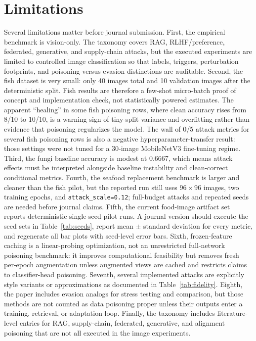 ﻿\documentclass[6p,10pt,times]{ieeeaccess}
\begin{document}
\section{Limitations}

Several limitations matter before journal submission. First, the empirical benchmark is vision-only. The taxonomy covers RAG, RLHF/preference, federated, generative, and supply-chain attacks, but the executed experiments are limited to controlled image classification so that labels, triggers, perturbation footprints, and poisoning-versus-evasion distinctions are auditable. Second, the fish dataset is very small: only 40 images total and 10 validation images after the deterministic split. Fish results are therefore a few-shot micro-batch proof of concept and implementation check, not statistically powered estimates. The apparent ``healing'' in some fish poisoning rows, where clean accuracy rises from 8/10 to 10/10, is a warning sign of tiny-split variance and overfitting rather than evidence that poisoning regularizes the model. The wall of 0/5 attack metrics for several fish poisoning rows is also a negative hyperparameter-transfer result: those settings were not tuned for a 30-image MobileNetV3 fine-tuning regime. Third, the fungi baseline accuracy is modest at 0.6667, which means attack effects must be interpreted alongside baseline instability and clean-correct conditional metrics. Fourth, the seafood replacement benchmark is larger and cleaner than the fish pilot, but the reported run still uses \(96\times96\) images, two training epochs, and \texttt{attack\_scale=0.12}; full-budget attacks and repeated seeds are needed before journal claims. Fifth, the current food-image artifact set reports deterministic single-seed pilot runs. A journal version should execute the seed sets in Table~\ref{tab:seeds}, report mean \(\pm\) standard deviation for every metric, and regenerate all bar plots with seed-level error bars. Sixth, frozen-feature caching is a linear-probing optimization, not an unrestricted full-network poisoning benchmark: it improves computational feasibility but removes fresh per-epoch augmentation unless augmented views are cached and restricts claims to classifier-head poisoning. Seventh, several implemented attacks are explicitly style variants or approximations as documented in Table~\ref{tab:fidelity}. Eighth, the paper includes evasion analogs for stress testing and comparison, but those methods are not counted as data poisoning proper unless their outputs enter a training, retrieval, or adaptation loop. Finally, the taxonomy includes literature-level entries for RAG, supply-chain, federated, generative, and alignment poisoning that are not all executed in the image experiments.
\end{document}
